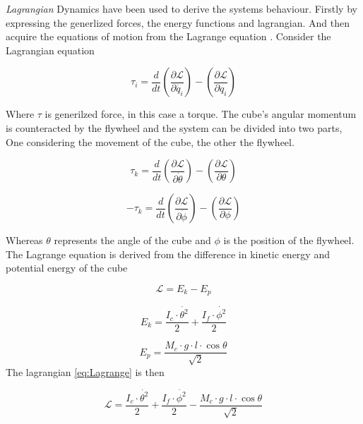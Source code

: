 \documentclass[a4paper,11pt]{kth-mag}
\begin{document}
\emph{Lagrangian} Dynamics have been used to derive the systems behaviour. Firstly by expressing the generlized forces, the energy functions and lagrangian. And then acquire the equations of motion from the Lagrange equation  \cite{Lagrangeref}. Consider the Lagrangian equation

\begin{equation}
\tau_i=\frac{d}{dt}\left(\frac{\partial \mathcal{L}}{\partial \dot{q_i}}\right)-\left(\frac{\partial \mathcal{L}}{\partial q_i}\right)
\end{equation}

Where $\tau$ is generilzed force, in this case a torque. The cube's angular momentum is counteracted by the flywheel and the system can be divided into two parts, One considering the movement of the cube, the other the flywheel.

\begin{equation} \label{eq:positiveL}
\tau_k=\frac{d}{dt}\left(\frac{\partial \mathcal{L}}{\partial \dot{\theta}}\right)-\left(\frac{\partial \mathcal{L}}{\partial \theta}\right)
\end{equation}

\begin{equation} \label{eq:negativeL}
-\tau_k=\frac{d}{dt}\left(\frac{\partial \mathcal{L}}{\partial \dot{\phi}}\right)-\left(\frac{\partial \mathcal{L}}{\partial \phi}\right)
\end{equation}

Whereas $\theta$ represents the angle of the cube and $\phi$ is the position of the flywheel. \\
The Lagrange equation is derived from the difference in kinetic energy and potential energy of the cube

\begin{equation} \label{eq:Lagrange}
\mathcal{L} = E_k - E_p
\end{equation}

\begin{equation} \label{eq:kinetic energy}
E_k = \frac{I_c \cdot \dot{\theta^2}}{2} + \frac{I_f \cdot \dot{\phi^2} }{2}
\end{equation}

\begin{equation} \label{eq:potential energy}
E_p = \frac{M_c \cdot g \cdot l \cdot \cos \theta}{\sqrt{2}}
\end{equation}
The lagrangian \eqref{eq:Lagrange} is then

\begin{equation}
\mathcal{L} = \frac{I_c \cdot \dot{\theta^2}}{2} + \frac{I_f \cdot \dot{\phi^2} }{2} - \frac{M_c \cdot g \cdot l \cdot \cos \theta}{\sqrt{2}} 
\end{equation}
\end{document}
